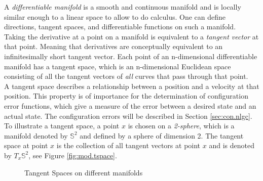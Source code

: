 A \textit{differentiable manifold} is a smooth and continuous manifold and is locally similar enough to a linear space to allow to do calculus. One can define directions, tangent spaces, and differentiable functions on such a manifold.\\ 
Taking the derivative at a point on a manifold is equivalent to a \textit{tangent vector} at that point. Meaning that derivatives are conceptually equivalent to an infinitesimally short tangent vector. 
Each point of an n-dimensional differentiable manifold has a tangent space, which is an n-dimensional Euclidean space consisting of all the tangent vectors of \textit{all} curves that pass through that point. \\
A tangent space describes a relationship between a position and a velocity at that position. This property is of importance for the determination of configuration error functions, which give a measure of the error between a desired state and an actual state. The configuration errors will be described in Section \ref{sec:con.nlgc}.\\
To illustrate a tangent space, a point  $ x $ is chosen on a \textit{2-sphere}, which is a manifold denoted by $ \mathbb{S}^2 $ and defined by a sphere of dimension 2. The tangent space at point $ x $ is the collection of all tangent vectors at point $ x $ and is denoted by $ T_x\mathbb{S}^2 $, see Figure \ref{fig:mod.tspace}. 
\begin{figure}[h!]
	\centering
	\caption{Tangent Spaces on different manifolds\label{fig:}}
\end{figure}		

